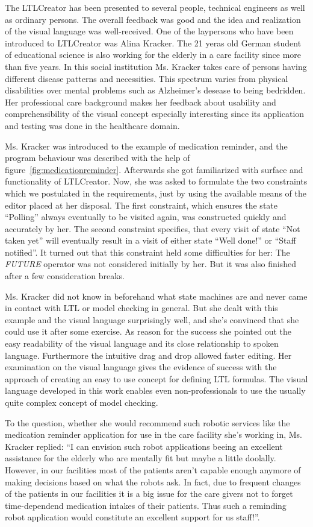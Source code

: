 The LTLCreator has been presented to several people, technical engineers as well as ordinary persons. The overall feedback was good and the idea and realization of the visual language was well-received. One of the laypersons who have been introduced to LTLCreator was Alina Kracker. The 21 yeras old German student of educational science is also working for the elderly in a care facility since more than five years. In this social institution Ms. Kracker takes care of persons having different disease patterns and necessities. This spectrum varies from physical disabilities over mental problems such as Alzheimer's desease to being bedridden.
Her professional care background makes her feedback about usability and comprehensibility of the visual concept especially interesting since its application and testing was done in the healthcare domain.

Ms. Kracker was introduced to the example of medication reminder, and the program behaviour was described with the help of figure~\ref{fig:medicationreminder}. Afterwards she got familiarized with surface and functionality of LTLCreator. Now, she was asked to formulate the two constraints which we postulated in the requirements, just by using the available means of the editor placed at her disposal.
The first constraint, which ensures the state ``Polling'' always eventually to be visited again, was constructed quickly and accurately by her.
The second constraint specifies, that every visit of state ``Not taken yet'' will eventually result in a visit of either state ``Well done!'' or ``Staff notified''. It turned out that this constraint held some difficulties for her: The \emph{FUTURE} operator was not considered initially by her. But it was also finished after a few consideration breaks.

Ms. Kracker did not know in beforehand what state machines are and never came in contact with LTL or model checking in general. But she dealt with this example and the visual language surprisingly well, and she's convinced that she could use it after some exercise. As reason for the success she pointed out the easy readability of the visual language and its close relationship to spoken language. Furthermore the intuitive drag and drop allowed faster editing.
Her examination on the visual language gives the evidence of success with the approach of creating an easy to use concept for defining LTL formulas. The visual language developed in this work enables even non-professionals to use the usually quite complex concept of model checking.

To the question, whether she would recommend such robotic services like the medication reminder application for use in the care facility she's working in, Ms. Kracker replied: ``I can envision such robot applications beeing an excellent assistance for the elderly who are mentally fit but maybe a little doolally. However, in our facilities most of the patients aren't capable enough anymore of making decisions based on what the robots ask. In fact, due to frequent changes of the patients in our facilities it is a big issue for the care givers not to forget time-dependend medication intakes of their patients. Thus such a reminding robot application would constitute an excellent support for us staff!''.